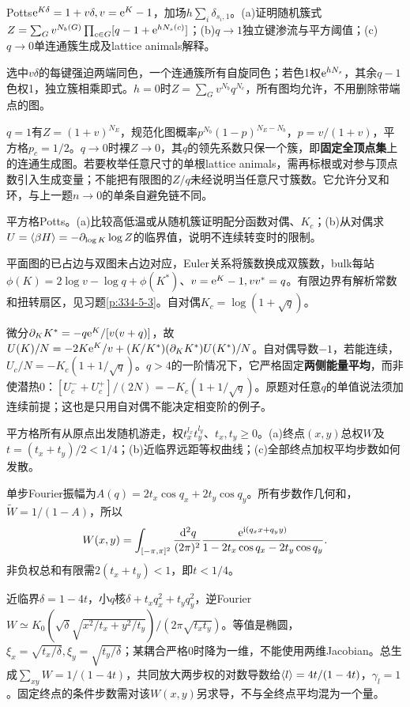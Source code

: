 \begin{exercise}[原题3(a)--(c)]\label{r:334-3-3}
Potts$\mathrm e^{K\delta}=1+v\delta,v=\mathrm e^K-1$，加场$h\sum_i\delta_{s_i,1}$。(a)证明随机簇式$Z=\sum_Gv^{N_b(G)}\prod_{c\in G}[q-1+\mathrm e^{hN_s(c)}]$；(b)$q\to1$独立键渗流与平方阈值；(c)$q\to0$单连通簇生成及lattice animals解释。
\end{exercise}
\begin{solution}
选中$v\delta$的每键强迫两端同色，一个连通簇所有自旋同色；若色1权$\mathrm e^{hN_s}$，其余$q-1$色权1，独立簇相乘即式。$h=0$时$Z=\sum_Gv^{N_b}q^{N_c}$，所有图均允许，不用删除带端点的图。

$q=1$有$Z=(1+v)^{N_E}$，规范化图概率$p^{N_b}(1-p)^{N_E-N_b}$，$p=v/(1+v)$，平方格$p_c=1/2$。$q\to0$时裸$Z\to0$，其$q$的领先系数只保一个簇，即\textbf{固定全顶点集}上的连通生成图。若要枚举任意尺寸的单根lattice animals，需再标根或对参与顶点数引入生成变量；不能把有限图的$Z/q$未经说明当任意尺寸簇数。它允许分叉和环，与上一题$n\to0$的单条自避免链不同。
\end{solution}
\begin{exercise}[原题4(a),(b)]\label{r:334-3-4}
平方格Potts。(a)比较高低温或从随机簇证明配分函数对偶、$K_c$；(b)从对偶求$U=\langle \beta H\rangle=-\partial_{\log K}\log Z$的临界值，说明不连续转变时的限制。
\end{exercise}
\begin{solution}
平面图的已占边与双图未占边对应，Euler关系将簇数换成双簇数，bulk每站$\phi(K)=2\log v-\log q+\phi(K^*)$、$v=\mathrm e^K-1,vv^*=q$。有限边界有解析常数和扭转扇区，见习题\ref{p:334-5-3}。自对偶$K_c=\log(1+\sqrt q)$。

微分$\partial_KK^*=-q\mathrm e^K/[v(v+q)]$，故$U(K)/N=-2K\mathrm e^K/v+(K/K^*)(\partial_KK^*)U(K^*)/N$。自对偶导数$-1$，若能连续，$U_c/N=-K_c(1+1/\sqrt q)$。$q>4$的一阶情况下，它严格固定\textbf{两侧能量平均}，而非使潜热0：$[U_c^-+U_c^+]/(2N)=-K_c(1+1/\sqrt q)$。原题对任意$q$的单值说法须加连续前提；这也是只用自对偶不能决定相变阶的例子。
\end{solution}
\begin{exercise}[原题5(a)--(c)]\label{r:334-3-5}
平方格所有从原点出发随机游走，权$t_x^{l_x}t_y^{l_y}$、$t_x,t_y\ge0$。(a)终点$(x,y)$总权$W$及$t=(t_x+t_y)/2<1/4$；(b)近临界远距等权曲线；(c)全部终点加权平均步数如何发散。
\end{exercise}
\begin{solution}
单步Fourier振幅为$A(q)=2t_x\cos q_x+2t_y\cos q_y$。所有步数作几何和，$\widetilde W=1/(1-A)$，所以
\begin{equation}
W(x,y)=\int_{[-\pi,\pi]^2}\frac{\,\mathrm d^2q}{(2\pi)^2}
\frac{\mathrm e^{\mathrm i(q_xx+q_yy)}}{1-2t_x\cos q_x-2t_y\cos q_y}.
\end{equation}
非负权总和有限需$2(t_x+t_y)<1$，即$t<1/4$。

近临界$\delta=1-4t$，小$q$核$\delta+t_xq_x^2+t_yq_y^2$，逆Fourier$W\simeq K_0(\sqrt\delta\sqrt{x^2/t_x+y^2/t_y})/(2\pi\sqrt{t_xt_y})$。等值是椭圆，$\xi_x=\sqrt{t_x/\delta},\xi_y=\sqrt{t_y/\delta}$；某耦合严格0时降为一维，不能使用两维Jacobian。总生成$\sum_{xy}W=1/(1-4t)$，共同放大两步权的对数导数给$\langle l\rangle=4t/(1-4t)$，$\gamma_l=1$。固定终点的条件步数需对该$W(x,y)$另求导，不与全终点平均混为一个量。
\end{solution}
